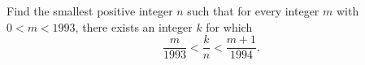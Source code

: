 Find the smallest positive integer $n$ such that for every integer $m$
with $0 < m < 1993$, there exists an integer $k$ for which
\[
\frac{m}{1993} < \frac{k}{n} < \frac{m+1}{1994}.
\]
